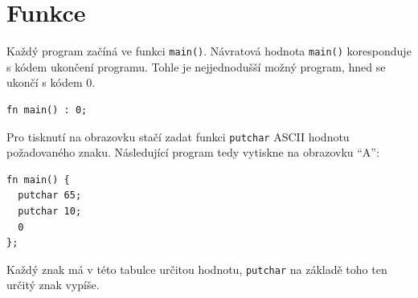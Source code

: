 \documentclass[12pt, a4paper, titlepage, abstract=on]{scrreprt}
\begin{document}
\section{Funkce}
Každý program začíná ve funkci \texttt{main()}. Návratová hodnota \texttt{main()} koresponduje s kódem ukončení programu.
Tohle je nejjednodušší možný program, hned se ukončí s kódem 0.
\begin{verbatim}
fn main() : 0;
\end{verbatim}
Pro tisknutí na obrazovku stačí zadat funkci \texttt{putchar} ASCII hodnotu požadovaného znaku. Následující program tedy vytiskne na obrazovku \enquote{A}:
\vspace{1em} \\
\begin{center}
\begin{minipage}{0.4\linewidth}
\begin{verbatim}
fn main() {
  putchar 65;
  putchar 10;
  0
};
\end{verbatim}
\end{minipage}
\begin{minipage}{0.5\linewidth}
Každý znak má v této tabulce určitou hodnotu, \texttt{putchar} na základě toho ten určitý znak vypíše.
\end{minipage}
\end{center}
\end{document}
